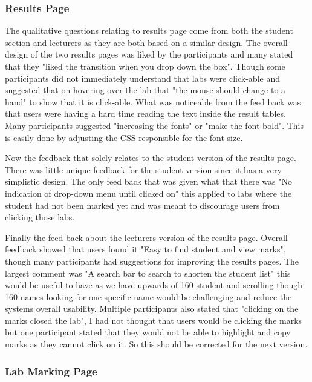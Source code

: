 \documentclass[12pt]{article}  %
\begin{document}
\subsubsection*{Results Page}

The qualitative questions relating to results page come from both the student section and lecturers as they are both based on a similar design. The overall design of the two results pages was liked by the participants and many stated that they "liked the transition when you drop down the box". Though some participants did not immediately understand that labs were click-able and suggested that on hovering over the lab that "the mouse should change to a hand"  to show that it is click-able. What was noticeable from the feed back was that users were having a hard time reading the text inside the result tables. Many participants suggested "increasing the fonts" or "make the font bold". This is easily done by adjusting the CSS responsible for the font size. 

\noindent Now the feedback that solely relates to the student version of the results page. There was little unique feedback for the student version since it has a very simplistic design. The only feed back that was given what that there was "No indication of drop-down menu until clicked on" this applied to labs where the student had not been marked yet and was meant to discourage users from clicking those labs.

\noindent Finally the feed back about the lecturers version of the results page. Overall feedback showed that users found it "Easy to find student and view marks", though many participants had suggestions for improving the results pages. The largest comment was "A search bar to search to shorten the student list" this would be useful to have as we have upwards of 160 student and scrolling though 160 names looking for one specific name would be challenging and reduce the systems overall usability. Multiple participants also stated that "clicking on the marks closed the lab", I had not thought that users would be clicking the marks but one participant stated that they would not be able to highlight and copy marks as they cannot click on it. So this should be corrected for the next version.



\subsubsection*{Lab Marking Page}
\end{document}
